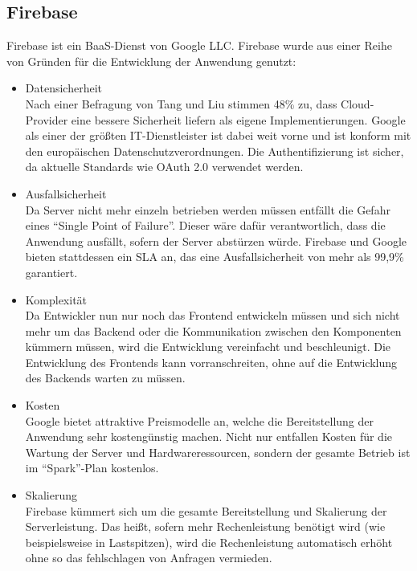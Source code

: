 \subsection{Firebase}
Firebase ist ein \ac{BaaS}-Dienst von Google LLC.
Firebase wurde aus einer Reihe von Gründen für die Entwicklung der Anwendung genutzt:
\begin{itemize}
    \item Datensicherheit\\
        Nach einer Befragung von Tang und Liu stimmen 48\% zu, dass Cloud-Provider eine bessere Sicherheit liefern als eigene Implementierungen.\autocite[S. 63]{TANG}
        Google als einer der größten IT-Dienstleister ist dabei weit vorne und ist konform mit den europäischen Datenschutzverordnungen.\autocite{firebaseDataprotection}
        Die Authentifizierung ist sicher, da aktuelle Standards wie OAuth 2.0 verwendet werden.
    \item Ausfallsicherheit\\
        Da Server nicht mehr einzeln betrieben werden müssen entfällt die Gefahr eines \enquote{Single Point of Failure}. %
        Dieser wäre dafür verantwortlich, dass die Anwendung ausfällt, sofern der Server abstürzen würde.
        Firebase und Google bieten stattdessen ein \ac{SLA} an, das eine Ausfallsicherheit von mehr als 99,9\% garantiert.\autocite{firebaseSLA}
    \item Komplexität\\
        Da Entwickler nun nur noch das Frontend entwickeln müssen und sich nicht mehr um das Backend oder die Kommunikation zwischen den Komponenten kümmern müssen, wird die Entwicklung vereinfacht und beschleunigt.
        Die Entwicklung des Frontends kann vorranschreiten, ohne auf die Entwicklung des Backends warten zu müssen.
    \item Kosten \\
        Google bietet attraktive Preismodelle an, welche die Bereitstellung der Anwendung sehr kostengünstig machen.
        Nicht nur entfallen Kosten für die Wartung der Server und Hardwareressourcen, sondern der gesamte Betrieb ist im \enquote{Spark}-Plan kostenlos.
    \item Skalierung \\
        Firebase kümmert sich um die gesamte Bereitstellung und Skalierung der Serverleistung.
        Das heißt, sofern mehr Rechenleistung benötigt wird (wie beispielsweise in Lastspitzen), wird die Rechenleistung automatisch erhöht ohne so das fehlschlagen von Anfragen vermieden.
\end{itemize}








